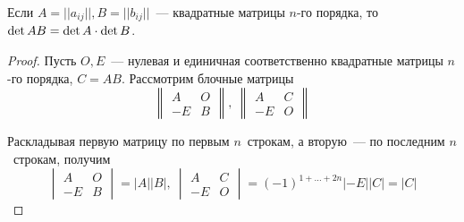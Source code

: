 \begin{theorem}
Если $A = ||a_{ij}||, B = ||b_{ij}||$~--- квадратные матрицы $n$-го порядка, то $\det AB \opbr= \det A \opbr\cdot \det B$.
\end{theorem}
\begin{proof}
Пусть $O, E$~--- нулевая и единичная соответственно квадратные матрицы $n$-го порядка, $C = AB$.
Рассмотрим блочные матрицы
\begin{equation*}
\begin{Vmatrix}
A & O \\
-E & B
\end{Vmatrix}, \
\begin{Vmatrix}
A & C \\
-E & O
\end{Vmatrix}
\end{equation*}

Раскладывая первую матрицу по первым $n$~строкам, а вторую~--- по последним $n$~строкам, получим
\begin{equation*}
\begin{vmatrix}
A & O \\
-E & B
\end{vmatrix} =
|A| |B|, \
\begin{vmatrix}
A & C \\
-E & O
\end{vmatrix} =
(-1)^{1 + \ldots + 2n}|-E| |C| =
|C|
\end{equation*}


\end{proof}
